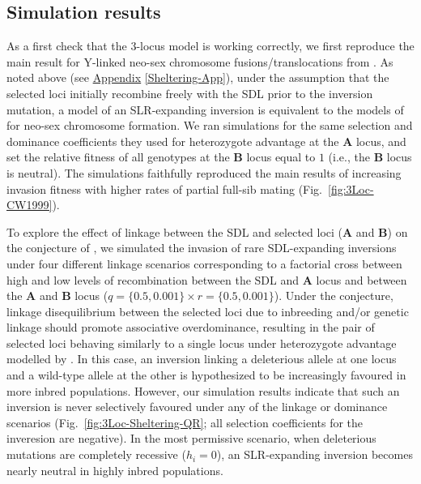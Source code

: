 \documentclass{article}
\def\mbf#1{\mathbf{#1}}
\begin{document}
\begin{appendices}
\subsection{Simulation results}

As a first check that the 3-locus model is working correctly, we first reproduce the main result for Y-linked neo-sex chromosome fusions/translocations from \citet{CharlesworthWall1999}. As noted above (see \hyperref[Sheltering-App]{Appendix} \ref{Sheltering-App}), under the assumption that the selected loci initially recombine freely with the SDL prior to the inversion mutation, a model of an SLR-expanding inversion is equivalent to the models of \citet{CharlesworthWall1999} for neo-sex chromosome formation. We ran simulations for the same selection and dominance coefficients they used for heterozygote advantage at the $\mbf{A}$ locus, and set the relative fitness of all genotypes at the $\mbf{B}$ locus equal to $1$ (i.e., the $\mbf{B}$ locus is neutral). The simulations faithfully reproduced the main results of increasing invasion fitness with higher rates of partial full-sib mating (Fig.~\ref{fig:3Loc-CW1999}).

To explore the effect of linkage between the SDL and selected loci ($\mbf{A}$ and $\mbf{B}$) on the conjecture of \citet{CharlesworthWall1999}, we simulated the invasion of rare SDL-expanding inversions under four different linkage scenarios corresponding to a factorial cross between high and low levels of recombination between the SDL and $\mbf{A}$ locus and between the $\mbf{A}$ and $\mbf{B}$ locus ($q = \{0.5, 0.001\} \times r = \{0.5, 0.001\}$). Under the conjecture, linkage disequilibrium between the selected loci due to inbreeding and/or genetic linkage should promote associative overdominance, resulting in the pair of selected loci behaving similarly to a single locus under heterozygote advantage modelled by \citep{CharlesworthWall1999}. In this case, an inversion linking a deleterious allele at one locus and a wild-type allele at the other is hypothesized to be increasingly favoured in more inbred populations. However, our simulation results indicate that such an inversion is never selectively favoured under any of the linkage or dominance scenarios (Fig.~\ref{fig:3Loc-Sheltering-QR}; all selection coefficients for the inveresion are negative). In the most permissive scenario, when deleterious mutations are completely recessive ($h_i = 0$), an SLR-expanding inversion becomes nearly neutral in highly inbred populations.


\end{appendices}
\end{document}
